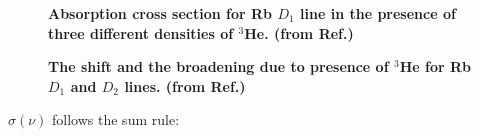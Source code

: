 \begin{figure}[t!]
	\centering
	\caption{{\bf Absorption cross section for Rb $D_{1}$ line in the presence of three different densities of $^{3}$He. (from Ref.\@ \cite{Romalis1997})}}
	\label{AbsorptionLine}
\end{figure}

\begin{figure}[t!]
	\centering
	\caption{{\bf The shift and the broadening due to presence of $^{3}$He for Rb $D_{1}$ and $D_{2}$ lines. (from Ref.\@ \cite{Romalis1997})}}
	\label{PressureBroadening}
\end{figure}

$\sigma(\nu)$ follows the sum rule:

